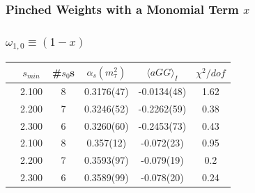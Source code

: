 \documentclass{beamer}
\begin{document}
\subsubsection{Pinched Weights with a Monomial Term \(x\)}
\begin{frame}
  \frametitle{\(\omega_{1,0} \equiv (1-x)\)}
  \centering
  \begin{tabular}{cccccc}
    \toprule
    & \(s_{min}\) & \#\(s_0\)s & \(\alpha_s(m_\tau^2)\) & \(\langle aGG \rangle_I\) & \(\chi^2/dof\)  \\
    \midrule
    \parbox[t]{2mm}{}
    & 2.100 & 8 & 0.3176(47) & -0.0134(48) & 1.62 \\
    & 2.200 & 7 & 0.3246(52) & -0.2262(59) & 0.38 \\
    & 2.300 & 6 & 0.3260(60) & -0.2453(73) & 0.43 \\
    \midrule
    \parbox[t]{2mm}{}
    & 2.100 & 8  & 0.357(12) & -0.072(23) & 0.95 \\
    & 2.200 & 7 &  0.3593(97) & -0.079(19) & 0.2 \\
    & 2.300 & 6 & 0.3589(99) & -0.078(20) & 0.24 \\
    \bottomrule
  \end{tabular}
\end{frame}
\end{document}
